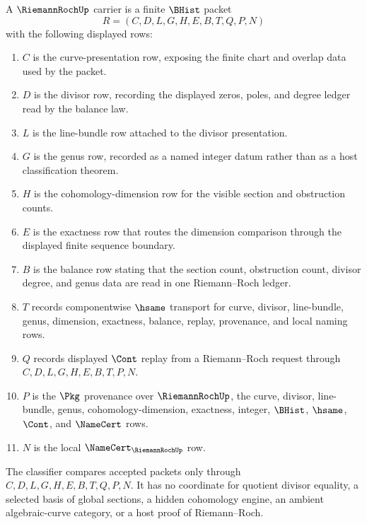\begin{definition}
\label{def:riemann-roch-carrier}
A $\RiemannRochUp$ carrier is a finite $\BHist$ packet
$$
R=(C,D,L,G,H,E,B,T,Q,P,N)
$$
with the following displayed rows:
\begin{enumerate}
\item $C$ is the curve-presentation row, exposing the finite chart and overlap data used by the packet.
\item $D$ is the divisor row, recording the displayed zeros, poles, and degree ledger read by the balance law.
\item $L$ is the line-bundle row attached to the divisor presentation.
\item $G$ is the genus row, recorded as a named integer datum rather than as a host classification theorem.
\item $H$ is the cohomology-dimension row for the visible section and obstruction counts.
\item $E$ is the exactness row that routes the dimension comparison through the displayed finite sequence boundary.
\item $B$ is the balance row stating that the section count, obstruction count, divisor degree, and genus data are read in one Riemann--Roch ledger.
\item $T$ records componentwise $\hsame$ transport for curve, divisor, line-bundle, genus, dimension, exactness, balance, replay, provenance, and local naming rows.
\item $Q$ records displayed $\Cont$ replay from a Riemann--Roch request through $C,D,L,G,H,E,B,T,P,N$.
\item $P$ is the $\Pkg$ provenance over $\RiemannRochUp$, the curve, divisor, line-bundle, genus, cohomology-dimension, exactness, integer, $\BHist$, $\hsame$, $\Cont$, and $\NameCert$ rows.
\item $N$ is the local $\NameCert_{\RiemannRochUp}$ row.
\end{enumerate}
The classifier compares accepted packets only through $C,D,L,G,H,E,B,T,Q,P,N$. It has no coordinate for quotient divisor equality, a selected basis of global sections, a hidden cohomology engine, an ambient algebraic-curve category, or a host proof of Riemann--Roch.
\end{definition}

